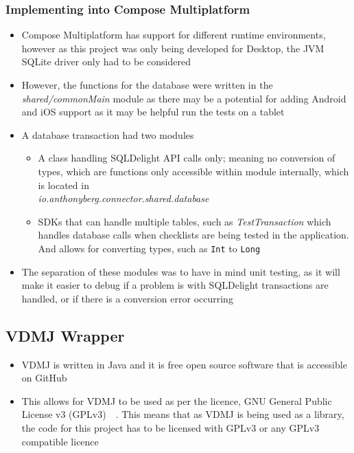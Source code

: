 \documentclass[../dissertation.tex]{subfiles}
\begin{document}
\subsubsection{Implementing into Compose Multiplatform}
\begin{itemize}
  \item Compose Multiplatform has support for different runtime environments,
    however as this project was only being developed for Desktop, the JVM
    SQLite driver only had to be considered
  \item However, the functions for the database were written in the \textit{shared/commonMain}
    module as there may be a potential for adding Android and iOS support as it may be
    helpful run the tests on a tablet
  \item A database transaction had two modules
    \begin{itemize}
      \item A class handling SQLDelight API calls only; meaning no conversion of types, which are
        functions only accessible within module internally, which is located in\\
        \textit{io.anthonyberg.connector.shared.database}
      \item SDKs that can handle multiple tables, such as \textit{TestTransaction} which handles database calls
        when checklists are being tested in the application.
        And allows for converting types, such as \lstinline|Int| to \lstinline|Long|
    \end{itemize}
  \item The separation of these modules was to have in mind unit testing, as
    it will make it easier to debug if a problem is with SQLDelight transactions
    are handled, or if there is a conversion error occurring
\end{itemize}

\subsection{VDMJ Wrapper}
\begin{itemize}
  \item VDMJ is written in Java and it is free open source software that is accessible on
    GitHub
  \item This allows for VDMJ to be used as per the licence, GNU General Public License v3
    (GPLv3)~\cite{vdmj:license}~\cite{gpl3}. This means that as VDMJ is being used as a
    library, the code for this project has to be licensed with GPLv3 or any GPLv3 compatible
    licence~\cite{gpl3:library}
\end{itemize}
\end{document}

